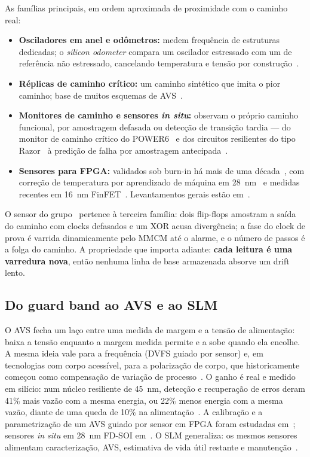\documentclass[11pt,a4paper]{article}
\begin{document}
As famílias principais, em ordem aproximada de proximidade com o caminho real:
\begin{itemize}
  \item \textbf{Osciladores em anel e odômetros:} medem frequência de estruturas dedicadas; o \emph{silicon odometer}
        compara um oscilador estressado com um de referência não estressado, cancelando temperatura e tensão por
        construção~\cite{kim2008odometer,keane2010odometer}.
  \item \textbf{Réplicas de caminho crítico:} um caminho sintético que imita o pior caminho; base de muitos esquemas de
        AVS~\cite{bowman2011resilient}.
  \item \textbf{Monitores de caminho e sensores \emph{in situ}:} observam o próprio caminho funcional, por amostragem
        defasada ou detecção de transição tardia --- do monitor de caminho crítico do POWER6~\cite{drake2007cpm} e dos
        circuitos resilientes do tipo Razor~\cite{ernst2004razor} à predição de falha por amostragem
        antecipada~\cite{agarwal2007failure}.
  \item \textbf{Sensores para FPGA:} validados sob burn-in há mais de uma década~\cite{valdespena2013,stott2010degradation,amouri2014aging},
        com correção de temperatura por aprendizado de máquina em 28~nm~\cite{huang2022aging} e medidas recentes em
        16~nm FinFET~\cite{sobas2024finfet}. Levantamentos gerais estão em~\cite{lanzieri2024review,juracy2020survey}.
\end{itemize}

O sensor do grupo~\cite{nogueira2025autotuning} pertence à terceira família: dois flip-flops amostram a saída do caminho com
clocks defasados e um XOR acusa divergência; a fase do clock de prova é varrida dinamicamente pelo MMCM até o alarme, e o
número de passos é a folga do caminho. A propriedade que importa adiante: \textbf{cada leitura é uma varredura nova}, então
nenhuma linha de base armazenada absorve um drift lento.

\subsection{Do guard band ao AVS e ao SLM}

O AVS fecha um laço entre uma medida de margem e a tensão de alimentação: baixa a tensão enquanto a margem medida permite
e a sobe quando ela encolhe. A mesma ideia vale para a frequência (DVFS guiado por sensor) e, em tecnologias com corpo
acessível, para a polarização de corpo, que historicamente começou como compensação de variação de
processo~\cite{tschanz2002abb}. O ganho é real e medido em silício: num núcleo resiliente de 45~nm, detecção e recuperação
de erros deram 41\% mais vazão com a mesma energia, ou 22\% menos energia com a mesma vazão, diante de uma queda de 10\%
na alimentação~\cite{bowman2011resilient}. A calibração e a parametrização de um AVS guiado por sensor em FPGA foram
estudadas em~\cite{niemann2020avs}; sensores \emph{in situ} em 28~nm FD-SOI em~\cite{saliva2015fdsoi}. O SLM generaliza:
os mesmos sensores alimentam caracterização, AVS, estimativa de vida útil restante e manutenção~\cite{kashyap2021slm}.
\end{document}
